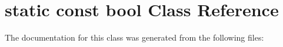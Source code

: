 \hypertarget{classstatic_01const_01bool}{}\section{static const bool Class Reference}
\label{classstatic_01const_01bool}


The documentation for this class was generated from the following files\+: